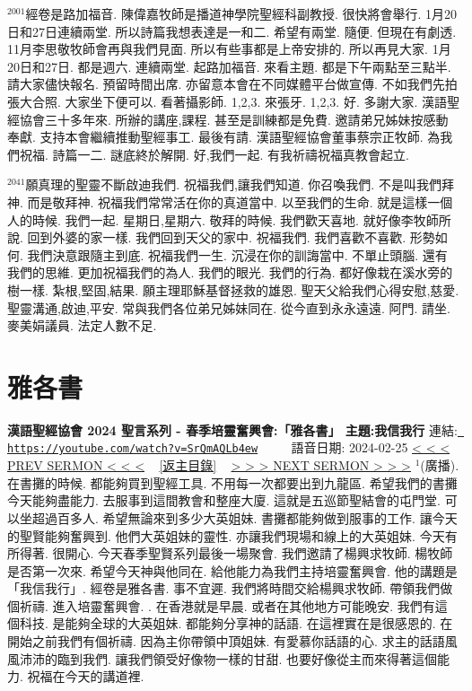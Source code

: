\documentclass{book}
\begin{document}
$^{2001}$經卷是路加福音.
陳偉嘉牧師是播道神學院聖經科副教授.
很快將會舉行.
1月20日和27日連續兩堂.
所以詩篇我想表達是一和二.
希望有兩堂.
隨便.
但現在有劇透.
11月李思敬牧師會再與我們見面.
所以有些事都是上帝安排的.
所以再見大家.
1月20日和27日.
都是週六.
連續兩堂.
起路加福音.
來看主題.
都是下午兩點至三點半.
請大家儘快報名.
預留時間出席.
亦留意本會在不同媒體平台做宣傳.
不如我們先拍張大合照.
大家坐下便可以.
看著攝影師.
1,2,3.
來張牙.
1,2,3.
好.
多謝大家.
漢語聖經協會三十多年來.
所辦的講座,課程.
甚至是訓練都是免費.
邀請弟兄姊妹按感動奉獻.
支持本會繼續推動聖經事工.
最後有請.
漢語聖經協會董事蔡宗正牧師.
為我們祝福.
詩篇一二.
謎底終於解開.
好,我們一起.
有我祈禱祝福真教會起立.

$^{2041}$願真理的聖靈不斷啟迪我們.
祝福我們,讓我們知道.
你召喚我們.
不是叫我們拜神.
而是敬拜神.
祝福我們常常活在你的真道當中.
以至我們的生命.
就是這樣一個人的時候.
我們一起.
星期日,星期六.
敬拜的時候.
我們歡天喜地.
就好像李牧師所說.
回到外婆的家一樣.
我們回到天父的家中.
祝福我們.
我們喜歡不喜歡.
形勢如何.
我們決意跟隨主到底.
祝福我們一生.
沉浸在你的訓誨當中.
不單止頭腦.
還有我們的思維.
更加祝福我們的為人.
我們的眼光.
我們的行為.
都好像栽在溪水旁的樹一樣.
紮根,堅固,結果.
願主理耶穌基督拯救的雄恩.
聖天父給我們心得安慰,慈愛.
聖靈溝通,啟迪,平安.
常與我們各位弟兄姊妹同在.
從今直到永永遠遠.
阿門.
請坐.
麥美娟議員.
法定人數不足.
\newpage



\section{雅各書}
\label{sec:SrQmAQLb4ew}
\textbf{漢語聖經協會 2024 聖言系列 - 春季培靈奮興會:「雅各書」 主題:我信我行}
\newline
\newline
連結: \href{https://youtube.com/watch?v=SrQmAQLb4ew}{\texttt{ https://youtube.com/watch?v=SrQmAQLb4ew}} ~~~~ 語音日期: 2024-02-25 
\newline
\newline
\hyperref[sec:A_3yEYQkm9Y]{\small{< < < PREV SERMON < < <}}
~
\hyperref[sec:index]{\small{[返主目錄]}}
~
\hyperref[sec:h6V3lBcFI1I]{\small{> > > NEXT SERMON > > >}}
\newline
\newline
$^{1}$(廣播).
在書攤的時候.
都能夠買到聖經工具.
不用每一次都要出到九龍區.
希望我們的書攤今天能夠盡能力.
去服事到這間教會和整座大廈.
這就是五巡節聖結會的屯門堂.
可以坐超過百多人.
希望無論來到多少大英姐妹.
書攤都能夠做到服事的工作.
讓今天的聖賢能夠奮興到.
他們大英姐妹的靈性.
亦讓我們現場和線上的大英姐妹.
今天有所得著.
很開心.
今天春季聖賢系列最後一場聚會.
我們邀請了楊興求牧師.
楊牧師是否第一次來.
希望今天神與他同在.
給他能力為我們主持培靈奮興會.
他的講題是「我信我行」.
經卷是雅各書.
事不宜遲.
我們將時間交給楊興求牧師.
帶領我們做個祈禱.
進入培靈奮興會.
.
在香港就是早晨.
或者在其他地方可能晚安.
我們有這個科技.
是能夠全球的大英姐妹.
都能夠分享神的話語.
在這裡實在是很感恩的.
在開始之前我們有個祈禱.
因為主你帶領中頂姐妹.
有愛慕你話語的心.
求主的話語風風沛沛的臨到我們.
讓我們領受好像物一樣的甘甜.
也要好像從主而來得著這個能力.
祝福在今天的講道裡.
\end{document}
